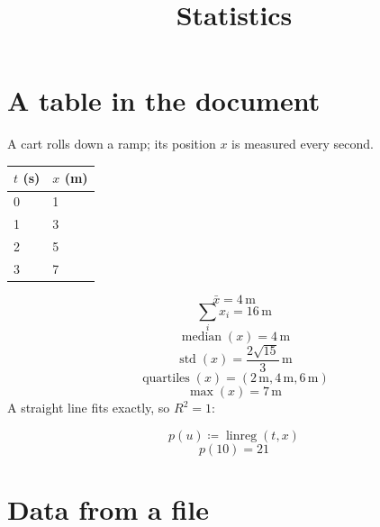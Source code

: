 \documentclass[11pt,a4paper]{article}
\title{Statistics}
\date{}
\theoremstyle{plain}
\theoremstyle{definition}
\theoremstyle{remark}
\begin{document}
\maketitle
\section*{A table in the document}

A cart rolls down a ramp; its position $x$ is measured every second.

\begin{center}
\begin{tabular}{ll}
\toprule
$t$ (s) & $x$ (m) \\
\midrule
0 & 1 \\
1 & 3 \\
2 & 5 \\
3 & 7 \\
\bottomrule
\end{tabular}
\end{center}
\begin{equation*}
  \bar{x} = 4\,\mathrm{m}
\end{equation*}
\begin{equation*}
  \sum_i x_i = 16\,\mathrm{m}
\end{equation*}
\begin{equation*}
  \operatorname{median}(x) = 4\,\mathrm{m}
\end{equation*}
\begin{equation*}
  \operatorname{std}(x) = \frac{2 \sqrt{15}}{3}\,\mathrm{m}
\end{equation*}
\begin{equation*}
  \operatorname{quartiles}(x) = \left(2\,\mathrm{m}, 4\,\mathrm{m}, 6\,\mathrm{m}\right)
\end{equation*}
\begin{equation*}
  \max(x) = 7\,\mathrm{m}
\end{equation*}
A straight line fits exactly, so $R^2 = 1$:

\begin{equation*}
  p(u) \coloneqq  \operatorname{linreg}(t, x)
\end{equation*}
\begin{equation*}
  p(10) = 21
\end{equation*}
\section*{Data from a file}
\end{document}
